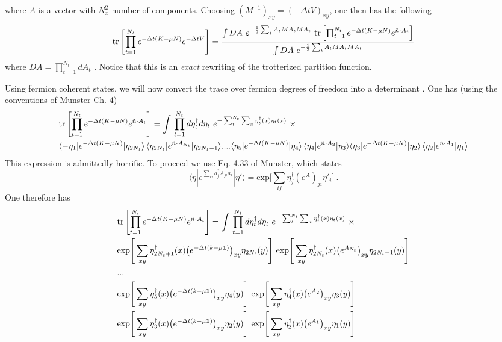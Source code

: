 where $A$ is a vector with $N_x^2$ number of components. Choosing $(M^{-1})_{xy} = (-\Delta t V)_{xy}$, one then has the following
\begin{equation}
\text{tr}\left[\prod_{t=1}^{N_t} e^{-\Delta t(K - \mu N)}  e^{-\Delta t V}  \right] = 
\frac{  
\int DA ~ e^{-\frac{1}{2} \sum_t {A}_t M {A}_t M A_t} ~ \text{tr}\left[\prod_{t=1}^{N_t} e^{-\Delta t(K - \mu N)}  e^{ \tilde{n}\cdot A_t} \right] 
}{ 
\int DA ~ e^{-\frac{1}{2} \sum_t {A}_t M {A}_t M A_t}  
}
\end{equation}
where $DA = \prod_{t=1}^{N_t} d A_t $ . Notice that this is an \emph{exact} rewriting of the trotterized partition function.


Using fermion coherent states, we will now convert the trace over fermion degrees of freedom into a determinant . One has (using the conventions of Munster Ch. 4)
\begin{align*}
& \text{tr}\left[\prod_{t=1}^{N_t} e^{-\Delta t(K - \mu N)}  e^{ \tilde{n}\cdot A_t} \right]  = \int{} \prod_{t=1}^{N_t} d \eta^{\dagger}_t d\eta_t ~ e^{- \sum_{t}^{N_t}\sum_x \eta^{\dagger}_t(x) \eta_t(x)}~ \times \\
& \langle -\eta_1 | e^{-\Delta t(K - \mu N)} | \eta_{2 N_t} \rangle \, \langle \eta_{2 N_t} | e^{ \tilde{n} \cdot A_{N_t}} | \eta_{2 N_t -1} \rangle ....
\langle \eta_5 | e^{-\Delta t(K - \mu N)} | \eta_4 \rangle \, \langle \eta_4 | e^{ \tilde{n} \cdot A_2} | \eta_3 \rangle
\langle \eta_3 | e^{-\Delta t(K - \mu N)} | \eta_2 \rangle \, \langle \eta_2 | e^{ \tilde{n} \cdot A_1} | \eta_1 \rangle
\end{align*}
This expression is admittedly horrific. To proceed we use Eq. 4.33 of Munster, which states
\begin{equation}
\langle \eta | e^{\sum_{ij} a^{\dagger}_j A_{ji} a_i} | \eta' \rangle = \text{exp}\Bigg[ \sum_{i j} \eta^{\dagger}_j (e^A)_{ji} \eta'_i \Bigg]~.
\end{equation}
One therefore has
\begin{align*}
& \text{tr}\left[\prod_{t=1}^{N_t} e^{-\Delta t(K - \mu N)}  e^{ \tilde{n}\cdot A_t} \right]  = \int{} \prod_{t=1}^{N_t} d \eta^{\dagger}_t d\eta_t ~ e^{- \sum_{t}^{N_t}\sum_x \eta^{\dagger}_t(x) \eta_t(x)}~ \times \\
& \text{exp}\Bigg[ \sum_{xy} \eta^{\dagger}_{2 N_t +1}(x) \big(e^{-\Delta t(k-\mu \mathbf{1})}\big)_{xy} \eta_{2 N_t}(y)\Bigg] ~ \text{exp}\Bigg[ \sum_{xy} \eta^{\dagger}_{2 N_t}(x) \big(e^{A_{N_t} }\big)_{xy} \eta_{2 N_t -1}(y) \Bigg] \\
& ... \\
& \text{exp}\Bigg[ \sum_{xy} \eta^{\dagger}_5(x) \big(e^{-\Delta t(k-\mu \mathbf{1})}\big)_{xy} \eta_4(y)\Bigg] ~ \text{exp}\Bigg[ \sum_{xy} \eta^{\dagger}_4(x) \big(e^{A_2}\big)_{xy} \eta_3(y) \Bigg] \\
& \text{exp}\Bigg[ \sum_{xy} \eta^{\dagger}_3(x) \big(e^{-\Delta t(k-\mu \mathbf{1})}\big)_{xy} \eta_2(y)\Bigg] ~ \text{exp}\Bigg[ \sum_{xy} \eta^{\dagger}_2(x) \big(e^{A_1}\big)_{xy} \eta_1(y) \Bigg] 
\end{align*}
